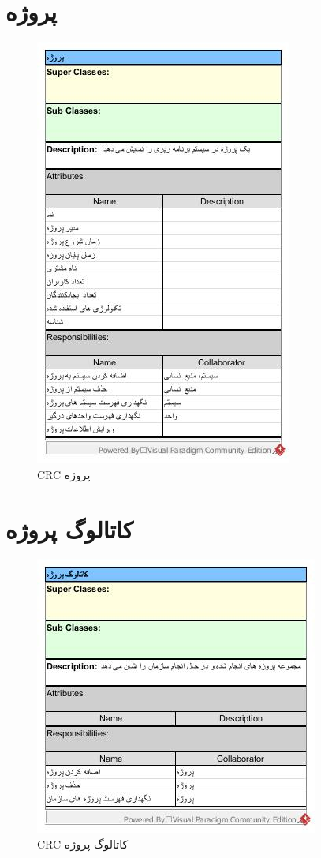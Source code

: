 \section{پروژه}
\begin{figure}[H]
	\centering
	\includegraphics[scale=0.9]{img/crc/Project}
	\caption{CRC پروژه }
\end{figure}

\section{کاتالوگ پروژه}
\begin{figure}[H]
	\centering
	\includegraphics[scale=0.9]{img/crc/ProjectCatalogue}
	\caption{CRC کاتالوگ پروژه }
\end{figure}

